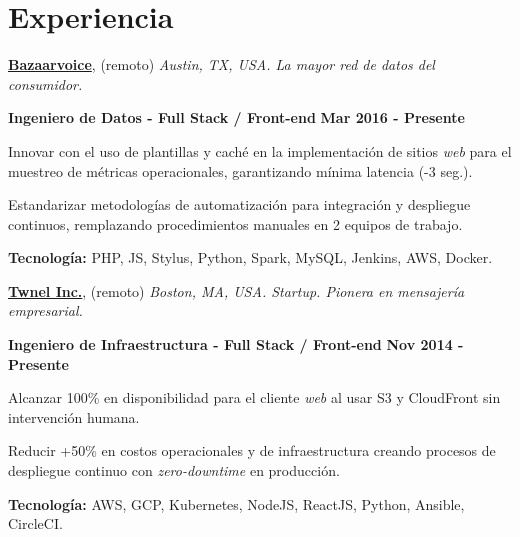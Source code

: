 \section{Experiencia}
%
\href{http://www.bazaarvoice.com/}{\textbf{Bazaarvoice}}, (remoto)
\textit{Austin, TX, USA. La mayor red de datos del consumidor.}

\begin{outerlist}
\item[\FA \faAngleDoubleRight] \textbf{Ingeniero de Datos -
Full Stack / Front-end}
\hfill
\textbf{Mar 2016 - Presente}
\end{outerlist}

\begin{innerlist}
\item Innovar con el uso de plantillas y caché en la implementación de sitios
\textit{web} para el muestreo de métricas operacionales, garantizando
mínima latencia (-3 seg.).
\item Estandarizar metodologías de automatización para integración y despliegue
continuos, remplazando procedimientos manuales en 2 equipos de trabajo.
\item \textbf{Tecnología:} PHP, JS, Stylus, Python, Spark, MySQL,
Jenkins, AWS, Docker.
\end{innerlist}

\quarterblankline

\href{http://www.twnel.com/}{\textbf{Twnel Inc.}}, (remoto) \textit{Boston, MA,
USA.
Startup.
Pionera en mensajería empresarial.}

\begin{outerlist}
\item[\FA \faAngleDoubleRight] \textbf{Ingeniero de Infraestructura -
Full Stack / Front-end}
\hfill
\textbf{Nov 2014 - Presente}
\end{outerlist}

\begin{innerlist}
\item Alcanzar 100\% en disponibilidad para el cliente
\textit{web} al usar S3 y CloudFront sin intervención humana.
\item Reducir +50\% en costos operacionales y de infraestructura creando
procesos de despliegue continuo con \textit{zero-downtime} en producción.
\item \textbf{Tecnología:} AWS, GCP, Kubernetes, NodeJS,
ReactJS, Python, Ansible, CircleCI. %
\end{innerlist}

\quarterblankline

